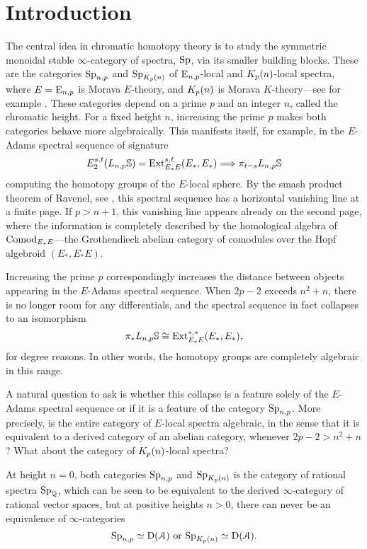 

\section{Introduction}
\label{ch1:sec:introduction}

The central idea in chromatic homotopy theory is to study the symmetric monoidal stable $\infty$-category of spectra, $\mathrm{Sp}$, via its smaller building blocks. These are the categories $\mathrm{Sp}_{n,p}$ and $\mathrm{Sp}_{{K_p(n)}}$ of ${\mathrm{E}_{n,p}}$-local and ${K_p(n)}$-local spectra, where $E={\mathrm{E}_{n,p}}$ is Morava $E$-theory, and ${K_p(n)}$ is Morava $K$-theory---see for example \cite{hovey-strickland_99}. These categories depend on a prime $p$ and an integer $n$, called the chromatic height. For a fixed height $n$, increasing the prime $p$ makes both categories behave more algebraically. This manifests itself, for example, in the $E$-Adams spectral sequence of signature
\[E^{s,t}_2 (L_{n,p}\mathbb{S}) = \operatorname{Ext}_{E_*E}^{s,t}(E_*,E_*)\Longrightarrow \pi_{t-s} L_{n,p}\mathbb{S}\]
computing the homotopy groups of the $E$-local sphere. By the smash product theorem of Ravenel, see \cite[7.5.6]{ravenel_92}, this spectral sequence has a horizontal vanishing line at a finite page. If $p>n+1$, this vanishing line appears already on the second page, where the information is completely described by the homological algebra of $\mathrm{Comod}_{E_*E}$---the Grothendieck abelian category of comodules over the Hopf algebroid $(E_*, E_*E)$. 

Increasing the prime $p$ correspondingly increases the distance between objects appearing in the $E$-Adams spectral sequence. When $2p-2$ exceeds $n^2+n$, there is no longer room for any differentials, and the  spectral sequence in fact collapses to an isomorphism
\[\pi_* L_{n,p}\mathbb{S}\cong \operatorname{Ext}^{*,*}_{E_*E}(E_*, E_*),\]
for degree reasons. In other words, the homotopy groups are completely algebraic in this range. 

A natural question to ask is whether this collapse is a feature solely of the $E$-Adams spectral sequence or if it is a feature of the category $\mathrm{Sp}_{n,p}$. More precisely, is the entire category of $E$-local spectra algebraic, in the sense that it is equivalent to a derived category of an abelian category, whenever $2p-2>n^2+n$? What about the category of ${K_p(n)}$-local spectra?

At height $n=0$, both categories $\mathrm{Sp}_{n,p}$ and $\mathrm{Sp}_{{K_p(n)}}$ is the category of rational spectra $\mathrm{Sp}_{\mathbb{Q}}$, which can be seen to be equivalent to the derived $\infty$-category of rational vector spaces, but at positive heights $n>0$, there can never be an equivalence of $\infty$-categories 
\[\mathrm{Sp}_{n,p} \simeq \mathrm{D}(\EuScript{A}) \text{ or } \mathrm{Sp}_{{K_p(n)}} \simeq \mathrm{D}(\EuScript{A}).\]

